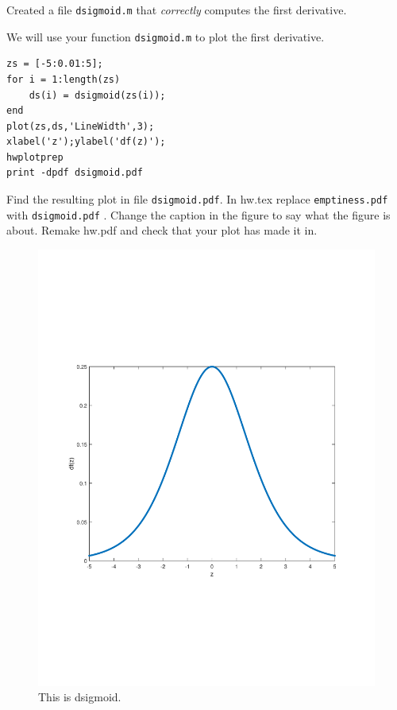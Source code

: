 \documentclass{article}
\begin{document}
Created a file {\tt dsigmoid.m} that {\em correctly} computes the first derivative.

\newproblem{0.5pt}

We will use your function {\tt dsigmoid.m} to plot the first derivative.
\begin{verbatim}
zs = [-5:0.01:5];
for i = 1:length(zs)
    ds(i) = dsigmoid(zs(i));
end
plot(zs,ds,'LineWidth',3);
xlabel('z');ylabel('df(z)');
hwplotprep
print -dpdf dsigmoid.pdf
\end{verbatim}

Find the resulting plot in file {\tt dsigmoid.pdf}. In hw\theHW.tex replace {\tt emptiness.pdf} with {\tt dsigmoid.pdf} . Change the
caption in the figure to say what the figure is about. Remake hw\theHW.pdf and check that your plot has made it in.
\begin{figure}[H]
\begin{center}
\includegraphics[scale=0.5]{dsigmoid.pdf}
\caption{This is dsigmoid.}
\end{center}
\end{figure}
\end{document}
